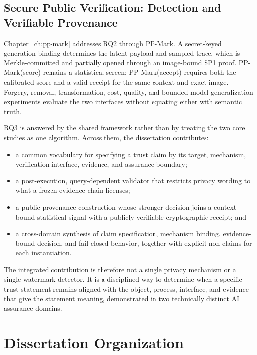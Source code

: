 \subsection{Secure Public Verification: Detection and Verifiable Provenance}
\label{subsec:ch1-contrib-provenance}

Chapter~\ref{ch:pp-mark} addresses RQ2 through PP-Mark.  A secret-keyed generation
binding determines the latent payload and sampled trace, which is Merkle-committed
and partially opened through an image-bound SP1 proof.  PP-Mark(score) remains a
statistical screen; PP-Mark(accept) requires both the calibrated score and a valid
receipt for the same context and exact image.  Forgery, removal, transformation,
cost, quality, and bounded model-generalization experiments evaluate the two
interfaces without equating either with semantic truth.

RQ3 is answered by the shared framework rather than by treating the two core
studies as one algorithm.  Across them, the dissertation contributes:

\begin{itemize}
    \item a common vocabulary for specifying a trust claim by its target,
    mechanism, verification interface, evidence, and assurance boundary;

    \item a post-execution, query-dependent validator that restricts privacy
    wording to what a frozen evidence chain licenses;

    \item a public provenance construction whose stronger decision joins a
    context-bound statistical signal with a publicly verifiable cryptographic
    receipt; and

    \item a cross-domain synthesis of claim specification, mechanism binding,
    evidence-bound decision, and fail-closed behavior, together with explicit
    non-claims for each instantiation.
\end{itemize}

The integrated contribution is therefore not a single privacy mechanism or a
single watermark detector.  It is a disciplined way to determine when a specific
trust statement remains aligned with the object, process, interface, and evidence
that give the statement meaning, demonstrated in two technically distinct AI
assurance domains.


\section{Dissertation Organization}
\label{sec:ch1-organization}

